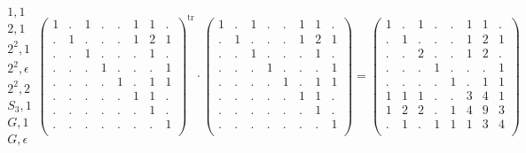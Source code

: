 \documentclass[12pt,a4paper]{amsart}
\begin{document}
\begin{align*}
  \begin{array}{r}
    1,1 \\
    2,1 \\
    2^2,1 \\
    2^2,\epsilon \\
    2^2,2 \\
    S_3,1 \\
    G,1 \\
    G, \epsilon
  \end{array}
  \left(
  \begin{array}{c|c|ccc|c|cc}
    1&.&1&.&.&1&1&.\\\hline
    .&1&.&.&.&1&2&1\\\hline
    .&.&1&.&.&.&1&.\\
    .&.&.&1&.&.&.&1\\
    .&.&.&.&1&.&1&1\\\hline
    .&.&.&.&.&1&1&.\\\hline
    .&.&.&.&.&.&1&.\\
    .&.&.&.&.&.&.&1\\
  \end{array}
\right)^{\mathrm{tr}}
\cdot
  \left(
  \begin{array}{c|c|ccc|c|cc}
    1&.&1&.&.&1&1&.\\\hline
    .&1&.&.&.&1&2&1\\\hline
    .&.&1&.&.&.&1&.\\
    .&.&.&1&.&.&.&1\\
    .&.&.&.&1&.&1&1\\\hline
    .&.&.&.&.&1&1&.\\\hline
    .&.&.&.&.&.&1&.\\
    .&.&.&.&.&.&.&1\\
  \end{array}
\right)
=
  \left(
  \begin{array}{c|c|ccc|c|cc}
    1&.&1&.&.&1&1&.\\\hline
    .&1&.&.&.&1&2&1\\\hline
    .&.&2&.&.&1&2&.\\
    .&.&.&1&.&.&.&1\\
    .&.&.&.&1&.&1&1\\\hline
    1&1&1&.&.&3&4&1\\\hline
    1&2&2&.&1&4&9&3\\
    .&1&.&1&1&1&3&4\\
  \end{array}
\right)
\end{align*}
\end{document}
